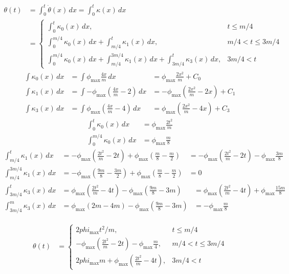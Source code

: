 \documentclass{article}
\begin{document}
\begin{align}
  \theta\left(t\right) &= \int_0^t \dot{\theta}\left(x\right)\,dx = \int_0^t \kappa\left(x\right)\,dx\\
  &= \left\{
    \begin{array}{cc}
      \int_0^t \kappa_{0}\left(x\right)\,dx,   & t \le m/4\\
      \int_0^{m/4} \kappa_{0}\left(x\right)\,dx + \int_{m/4}^t     \kappa_{1}\left(x\right)\,dx,   & m/4 < t \le 3m/4\\
      \int_0^{m/4} \kappa_{0}\left(x\right)\,dx + \int_{m/4}^{3m/4} \kappa_{1}\left(x\right)\,dx + \int_{3m/4}^t \kappa_{3}\left(x\right)\,dx, & 3m/4 < t
    \end{array}
  \right.
\end{align}
\begin{align}
  \int \kappa_{0}\left(x\right)\,dx &= \int \phi_{\max}\frac{4x}{m}\,dx &= \phi_{\max}\frac{2x^{2}}{m} + C_{0}\\
  \int \kappa_{1}\left(x\right)\,dx &= \int -\phi_{\max}\left(\frac{4x}{m}-2\right)\,dx &= -\phi_{\max}\left(\frac{2x^{2}}{m}-2x\right) + C_{1}\\
  \int \kappa_{3}\left(x\right)\,dx &= \int \phi_{\max}\left(\frac{4x}{m}-4\right)\,dx &= \phi_{\max}\left(\frac{2x^{2}}{m}-4x\right) + C_{3}
\end{align}
\begin{align}
  \int_{0}^{t} \kappa_{0}\left(x\right)\,dx &= \phi_{\max}\frac{2t^{2}}{m}\\
  \int_{0}^{m/4} \kappa_{0}\left(x\right)\,dx &= \phi_{\max}\frac{m}{8}
\end{align}
\begin{align}
  \int_{m/4}^{t} \kappa_{1}\left(x\right)\,dx &= -\phi_{\max}\left(\frac{2t^{2}}{m}-2t\right) + \phi_{\max}\left(\frac{m}{8}-\frac{m}{2}\right) &= -\phi_{\max}\left(\frac{2t^{2}}{m}-2t\right) - \phi_{\max}\frac{3m}{8}\\
  \int_{m/4}^{3m/4} \kappa_{1}\left(x\right)\,dx &= -\phi_{\max}\left(\frac{9m}{8}-\frac{3m}{2}\right) + \phi_{\max}\left(\frac{m}{8}-\frac{m}{2}\right) &= 0
\end{align}
\begin{align}
  \int_{3m/4}^{t} \kappa_{3}\left(x\right)\,dx &= \phi_{\max}\left(\frac{2t^{2}}{m}-4t\right) - \phi_{\max}\left(\frac{9m}{8}-3m\right) &= \phi_{\max}\left(\frac{2t^{2}}{m}-4t\right) + \phi_{\max}\frac{15m}{8}\\
  \int_{3m/4}^{m} \kappa_{3}\left(x\right)\,dx &= \phi_{\max}\left(2m-4m\right) - \phi_{\max}\left(\frac{9m}{8}-3m\right) &= -\phi_{\max}\frac{m}{8}
\end{align}

\begin{align}
  \theta\left(t\right) &= \left\{
    \begin{array}{cc}
      2 phi_\max t^2 / m,   & t \le m/4\\
      -\phi_{\max}\left(\frac{2t^{2}}{m}-2t\right) - \phi_{\max}\frac{m}{4},& m/4 < t \le 3m/4\\
      2phi_{\max}m + \phi_{\max}\left(\frac{2t^{2}}{m}-4t\right), & 3m/4 < t
    \end{array}
  \right.
\end{align}
\end{document}
